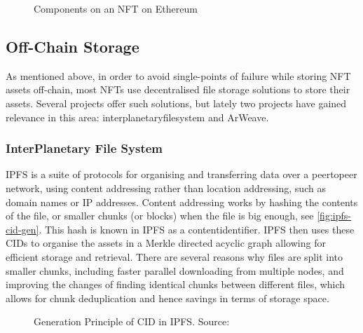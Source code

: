\begin{figure}[h]
    \centering
    \captionsetup{justification=centering}
    
    \caption[Components on an NFT on on Ethereum]{Components on an NFT on Ethereum}
    \label{fig:nftcomponents}
\end{figure}

\subsection{Off-Chain Storage}
\label{sec:offchain_storage}

As mentioned above, in order to avoid single-points of failure while storing NFT assets off-chain, most NFTs use decentralised file storage solutions to store their assets. Several projects offer such solutions, but lately two projects have gained relevance in this area: \gls{interplanetaryfilesystem} and ArWeave. 

\subsubsection{InterPlanetary File System}
\label{sec:ipfs}

IPFS is a suite of protocols for organising and transferring data over a \gls{peertopeer} network, using content addressing rather than location addressing, such as domain names or IP addresses.
Content addressing works by hashing the contents of the file, or smaller chunks (or blocks) when the file is big enough, see \autoref{fig:ipfs-cid-gen}. This hash is known in IPFS as a \gls{contentidentifier}. IPFS then uses these CIDs to organise the assets in a Merkle \gls{directed acyclic graph} allowing for efficient storage and retrieval. There are several reasons why files are split into smaller chunks, including faster parallel downloading from multiple nodes, and improving the changes of finding identical chunks between different files, which allows for chunk deduplication and hence savings in terms of storage space. \cite{juBlockchainTraceabilitySystem2022}

\begin{figure}[h]
    \centering
    \captionsetup{justification=centering}
    
    \caption[Generation Principle of CID in IPFS]{Generation Principle of CID in IPFS. Source: \cite[p.3]{juBlockchainTraceabilitySystem2022}}
    \label{fig:ipfs-cid-gen}
\end{figure}

